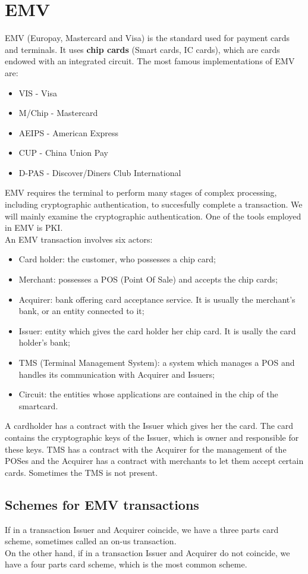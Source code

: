 \documentclass[a4paper, 10pt, titlepage]{article}
\begin{document}
\section{EMV}
EMV (Europay, Mastercard and Visa) is the standard used for payment cards and terminals. It uses \textbf{chip cards} (Smart cards, IC cards), which are cards endowed with an integrated circuit. The most famous implementations of EMV are:
\begin{itemize}
\item VIS - Visa
\item M/Chip - Mastercard
\item AEIPS - American Express
\item CUP - China Union Pay
\item D-PAS - Discover/Diners Club International
\end{itemize}
EMV requires the terminal to perform many stages of complex processing, including cryptographic authentication, to succesfully complete a transaction. We will mainly examine the cryptographic authentication. One of the tools employed in EMV is PKI.\\
An EMV transaction involves six actors:
\begin{itemize}
\item Card holder: the customer, who possesses a chip card;
\item Merchant: possesses a POS (Point Of Sale) and accepts the chip cards;
\item Acquirer: bank offering card acceptance service. It is usually the merchant's bank, or an entity connected to it;
\item Issuer: entity which gives the card holder her chip card. It is usally the card holder's bank;
\item TMS (Terminal Management System): a system which manages a POS and handles its communication with Acquirer and Issuers;
\item Circuit: the entities whose applications are contained in the chip of the smartcard.
\end{itemize}
A cardholder has a contract with the Issuer which gives her the card. The card contains the cryptographic keys of the Issuer, which is owner and responsible for these keys. TMS has a contract with the Acquirer for the management of the POSes and the Acquirer has a contract with merchants to let them accept certain cards. Sometimes the TMS is not present. 

\subsection{Schemes for EMV transactions}
If in a transaction Issuer and Acquirer coincide, we have a three parts card scheme, sometimes called an on-us transaction.\\
On the other hand, if in a transaction Issuer and Acquirer do not coincide, we have a four parts card scheme, which is the most common scheme.
\end{document}
